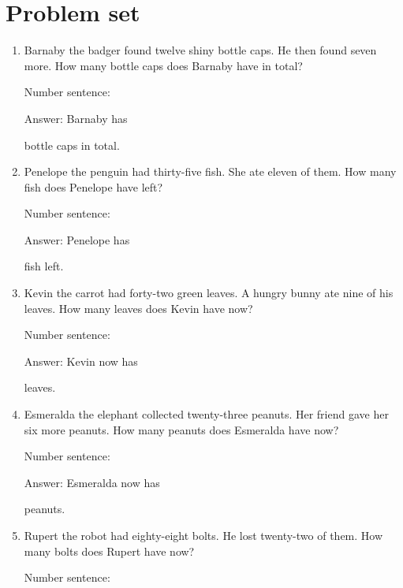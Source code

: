 \documentclass{tufte-book}
\begin{document}
\clearpage\section{Problem set }

\begin{enumerate}

\item
  Barnaby the badger found twelve shiny bottle caps. He then found seven
  more. How many bottle caps does Barnaby have in total?\medskip\par
  Number sentence:
  \dotfill\medskip\par
  Answer: Barnaby has
  \dotfill\medskip\par\mbox{}\dotfill\medskip\par\mbox{}\dotfill\bigskip
  bottle caps in total.
\item
  Penelope the penguin had thirty-five fish. She ate eleven of them. How
  many fish does Penelope have left?\medskip\par
  Number sentence:
  \dotfill\medskip\par
  Answer: Penelope has
  \dotfill\medskip\par\mbox{}\dotfill\medskip\par\mbox{}\dotfill\bigskip
  fish left.
\item
  Kevin the carrot had forty-two green leaves. A hungry bunny ate nine
  of his leaves. How many leaves does Kevin have now?\medskip\par
  Number sentence:
  \dotfill\medskip\par
  Answer: Kevin now has
  \dotfill\medskip\par\mbox{}\dotfill\medskip\par\mbox{}\dotfill\bigskip
  leaves.
\item
  Esmeralda the elephant collected twenty-three peanuts. Her friend gave
  her six more peanuts. How many peanuts does Esmeralda have now?\medskip\par
  Number sentence:
  \dotfill\medskip\par
  Answer: Esmeralda now has
  \dotfill\medskip\par\mbox{}\dotfill\medskip\par\mbox{}\dotfill\bigskip
  peanuts.
\item
  Rupert the robot had eighty-eight bolts. He lost twenty-two of them.
  How many bolts does Rupert have now?\medskip\par
  Number sentence:
  \dotfill\medskip\par

\end{enumerate}
\end{document}
